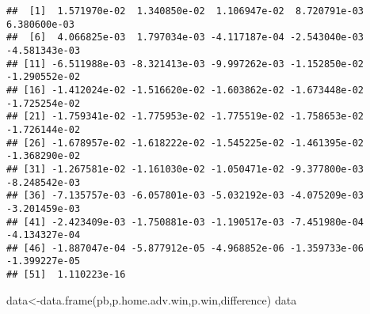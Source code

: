 \documentclass[
]{article}
\newenvironment{Shaded}{\begin{snugshade}}{\end{snugshade}}
\newcommand{\FunctionTok}[1]{\textcolor[rgb]{0.00,0.00,0.00}{#1}}
\newcommand{\NormalTok}[1]{#1}
\newcommand{\OtherTok}[1]{\textcolor[rgb]{0.56,0.35,0.01}{#1}}
\begin{document}
\begin{verbatim}
##  [1]  1.571970e-02  1.340850e-02  1.106947e-02  8.720791e-03  6.380600e-03
##  [6]  4.066825e-03  1.797034e-03 -4.117187e-04 -2.543040e-03 -4.581343e-03
## [11] -6.511988e-03 -8.321413e-03 -9.997262e-03 -1.152850e-02 -1.290552e-02
## [16] -1.412024e-02 -1.516620e-02 -1.603862e-02 -1.673448e-02 -1.725254e-02
## [21] -1.759341e-02 -1.775953e-02 -1.775519e-02 -1.758653e-02 -1.726144e-02
## [26] -1.678957e-02 -1.618222e-02 -1.545225e-02 -1.461395e-02 -1.368290e-02
## [31] -1.267581e-02 -1.161030e-02 -1.050471e-02 -9.377800e-03 -8.248542e-03
## [36] -7.135757e-03 -6.057801e-03 -5.032192e-03 -4.075209e-03 -3.201459e-03
## [41] -2.423409e-03 -1.750881e-03 -1.190517e-03 -7.451980e-04 -4.134327e-04
## [46] -1.887047e-04 -5.877912e-05 -4.968852e-06 -1.359733e-06 -1.399227e-05
## [51]  1.110223e-16
\end{verbatim}

\begin{Shaded}
\begin{Highlighting}[]
\NormalTok{data}\OtherTok{\textless{}{-}}\FunctionTok{data.frame}\NormalTok{(pb,p.home.adv.win,p.win,difference)}
\NormalTok{data}
\end{Highlighting}
\end{Shaded}
\end{document}
